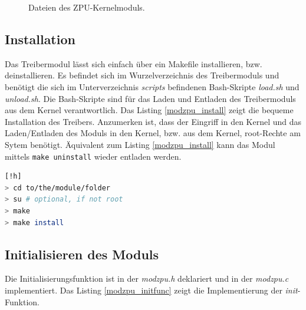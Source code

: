 \documentclass[11pt]{scrartcl}
\begin{document}
\begin{figure}[H]
\begin{center}
\end{center}
\caption{Dateien des ZPU-Kernelmoduls.}
\end{figure}


\subsection{Installation}

Das Treibermodul lässt sich einfach über ein Makefile installieren, bzw. deinstallieren. Es befindet sich im Wurzelverzeichnis des Treibermoduls und benötigt die sich im Unterverzeichnis  \textit{scripts} befindenen Bash-Skripte \textit{load.sh} und \textit{unload.sh}. Die Bash-Skripte sind für das Laden und Entladen des Treibermoduls aus dem Kernel verantwortlich.
Das Listing \ref{modzpu_install} zeigt die bequeme Installation des Treibers. Anzumerken ist, dass der Eingriff in den Kernel und das Laden/Entladen des Moduls in den Kernel, bzw. aus dem Kernel, root-Rechte am Sytem benötigt. Äquivalent zum Listing \ref{modzpu_install} kann das Modul mittels \texttt{make uninstall} wieder entladen werden. 

\begin{lstlisting}[label=modzpu_install,language=bash, caption=Installation des Treibermoduls][!h]
> cd to/the/module/folder
> su # optional, if not root
> make
> make install
\end{lstlisting}


\subsection{Initialisieren des Moduls}

Die Initialisierungsfunktion ist in der \textit{modzpu.h} deklariert und in der \textit{modzpu.c} implementiert. Das Listing \ref{modzpu_initfunc} zeigt die Implementierung der \textit{init}-Funktion.
\end{document}

